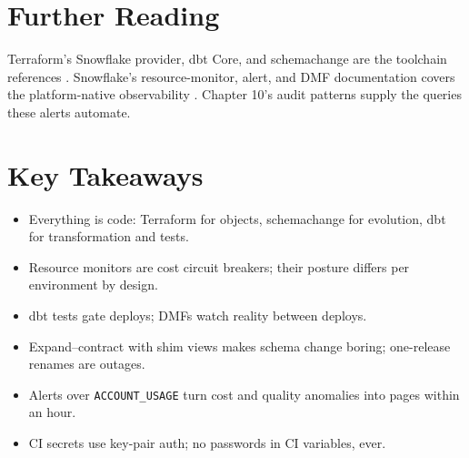 \section{Further Reading}
Terraform's Snowflake provider, dbt Core, and schemachange are the toolchain references \cite{terraformDocs,terraformSnowflakeProvider,dbtCoreDocs,schemachangeDocs}. Snowflake's resource-monitor, alert, and DMF documentation covers the platform-native observability \cite{snowflakeResourceMonitorsDocs,snowflakeAlertsDocs,snowflakeDmfDocs}. Chapter 10's audit patterns supply the queries these alerts automate.

\section*{Key Takeaways}
\begin{itemize}
    \item Everything is code: Terraform for objects, schemachange for evolution, dbt for transformation and tests.
    \item Resource monitors are cost circuit breakers; their posture differs per environment by design.
    \item dbt tests gate deploys; DMFs watch reality between deploys.
    \item Expand--contract with shim views makes schema change boring; one-release renames are outages.
    \item Alerts over \texttt{ACCOUNT\_USAGE} turn cost and quality anomalies into pages within an hour.
    \item CI secrets use key-pair auth; no passwords in CI variables, ever.
\end{itemize}

